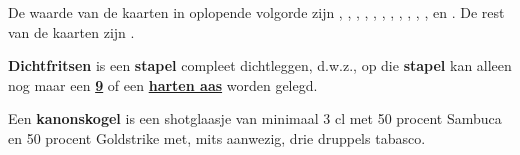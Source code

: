 \item \label{item:kaarten_2} De waarde van de kaarten in oplopende volgorde zijn , , , , , , , , , , ,  en . De rest van de kaarten zijn .

\item \textbf{Dichtfritsen} is een \textbf{stapel} compleet dichtleggen, d.w.z., op die \textbf{stapel} kan alleen nog maar een \ul{\textbf{9}} of een \ul{\textbf{harten aas}} worden gelegd.



\item \label{item:kanonskogel} Een \textbf{kanonskogel} is een shotglaasje van minimaal 3 cl met 50 procent Sambuca en 50 procent Goldstrike met, mits aanwezig, drie druppels tabasco.

\eindABCLijst

